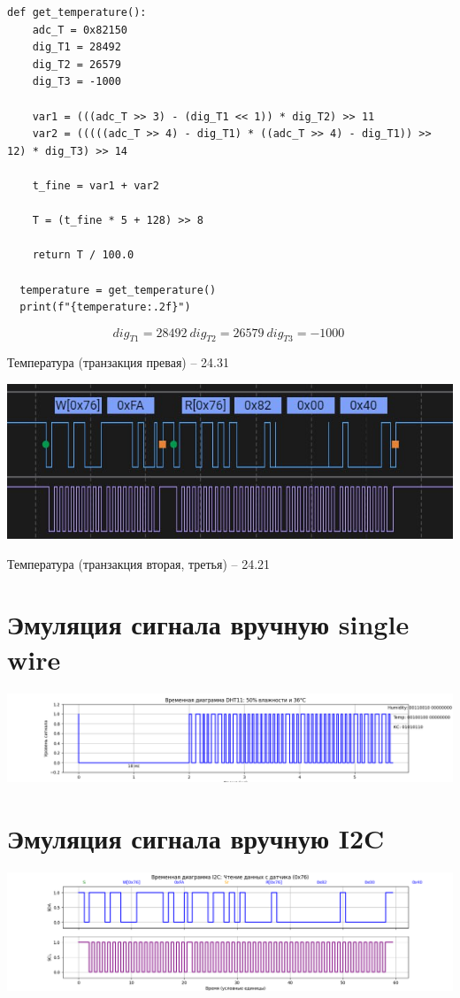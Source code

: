 \documentclass{article}
\begin{document}
\begin{lstlisting}[caption={main.py}, label={lst:example}]
  def get_temperature():
    adc_T = 0x82150  
    dig_T1 = 28492
    dig_T2 = 26579
    dig_T3 = -1000

    var1 = (((adc_T >> 3) - (dig_T1 << 1)) * dig_T2) >> 11
    var2 = (((((adc_T >> 4) - dig_T1) * ((adc_T >> 4) - dig_T1)) >> 12) * dig_T3) >> 14

    t_fine = var1 + var2

    T = (t_fine * 5 + 128) >> 8

    return T / 100.0  

  temperature = get_temperature()
  print(f"{temperature:.2f}")

\end{lstlisting}


\[
dig_{T1} = 28492\ 
dig_{T2} = 26579\
dig_{T3} = -1000\
\]


Температура (транзакция превая) -- 24.31


\begin{center}
  \includegraphics[width=.9\textwidth]{i2c-3.jpg}
\end{center}

Температура (транзакция вторая, третья) -- 24.21


\section{Эмуляция сигнала вручную single wire}


\begin{center}
  \includegraphics[width=.9\textwidth]{handmadedh.png}
\end{center}

\section{Эмуляция сигнала вручную I2C}
\begin{center}
  \includegraphics[width=.9\textwidth]{i2c_diagram_updated.png}
\end{center}
\end{document}
